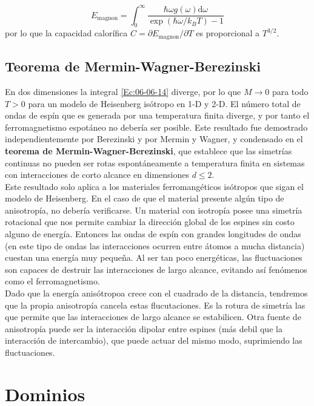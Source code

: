 \documentclass[12pt,a4paper]{book}
\numberwithin{equation}{section}
\numberwithin{figure}{section}
\newcommand{\D}{\mathrm{d}}
\begin{document}
\begin{equation}
    E_{\mathrm{magnon}} = \int_0^\infty \frac{\hbar \omega g(\omega) \D \omega}{\exp(\hbar \omega / k_B T)-1}
\end{equation}
por lo que la capacidad calorífica $C=\partial E_{\mathrm{magnon}} / \partial T$ es proporcional a $T^{3/2}$.

\subsection{Teorema de Mermin-Wagner-Berezinski}

En dos dimensiones la integral \ref{Ec:06-06-14} diverge, por lo que $M \rightarrow 0$ para todo $T>0$ para un modelo de Heisenberg isótropo en 1-D y 2-D. El número total de ondas de espín que es generada por una temperatura finita diverge, y por tanto el ferromagnetismo espotáneo no debería ser posible. Este resultado fue demostrado independientemente por Berezinski y por Mermin y Wagner, y condensado en el \textbf{teorema de Mermin-Wagner-Berezinski}, que establece que las simetrías continuas no pueden ser rotas espontáneamente a temperatura finita en sistemas con interacciones de corto alcance en dimensiones $d\leq 2$. \\

Este resultado solo aplica a los materiales ferromangéticos isótropos que sigan el modelo de Heisenberg. En el caso de que el material presente algún tipo de anisotropía, no debería verificarse. Un material con isotropía posee una simetría rotacional que nos permite cambiar la dirección global de los espines sin costo alguno de energía. Entonces las ondas de espín con grandes longitudes de ondas (en este tipo de ondas las interacciones ocurren entre átomos a mucha distancia) cuestan una energía muy pequeña. Al ser tan poco energéticas, las fluctuaciones son capaces de destruir las interacciones de largo alcance, evitando así fenómenos como el ferromagnetismo. \\

Dado que la energía anisótropoa crece con el cuadrado de la distancia, tendremos que la propia anisotropía cancela estas flucutaciones. Es la rotura de simetría las que permite que las interacciones de largo alcance se estabilicen. Otra fuente de anisotropía puede ser la interacción dipolar entre espines (más debil que la interacción de intercambio), que puede actuar del mismo modo, suprimiendo las fluctuaciones.  


\section{Dominios}
\end{document}

